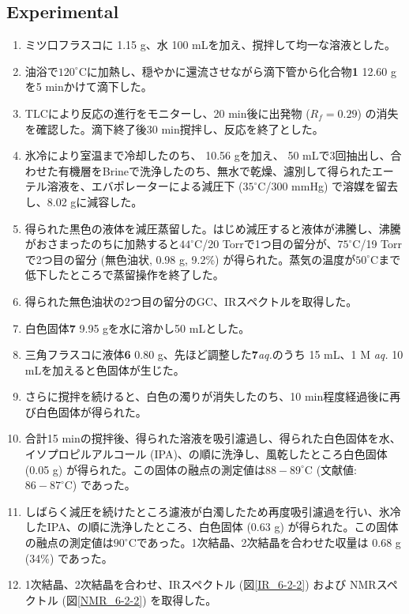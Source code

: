 \documentclass{ltjsarticle}
\theoremstyle{definition}
\numberwithin{equation}{section}
\newcommand{\D}{^\circ\text{C}}
\begin{document}
\subsection{Experimental}
\begin{enumerate}
\item ミツ口フラスコに 1.15 g、水 100 mLを加え、撹拌して均一な溶液とした。
\item 油浴で$120\D$に加熱し、穏やかに還流させながら滴下管から化合物\textbf{1} 12.60 gを5 minかけて滴下した。 
\item TLCにより反応の進行をモニターし、20 min後に出発物 ($R_f = 0.29
$) の消失を確認した。滴下終了後30 min撹拌し、反応を終了とした。
\item 氷冷により室温まで冷却したのち、 10.56 gを加え、 50 mLで3回抽出し、合わせた有機層をBrineで洗浄したのち、無水で乾燥、濾別して得られたエーテル溶液を、エバポレーターによる減圧下 ($35\D$/300 mmHg) で溶媒を留去し、8.02 gに減容した。
\item 得られた黒色の液体を減圧蒸留した。はじめ減圧すると液体が沸騰し、沸騰がおさまったのちに加熱すると$44\D$/20 Torrで1つ目の留分が、$75\D$/19 Torrで2つ目の留分 (無色油状, 0.98 g, 9.2\%) が得られた。蒸気の温度が$50\D$まで低下したところで蒸留操作を終了した。
\item 得られた無色油状の2つ目の留分のGC、IRスペクトルを取得した。
\item 白色固体\textbf{7} 9.95 gを水に溶かし50 mLとした。
\item 三角フラスコに液体\textbf{6} 0.80 g、先ほど調整した\textbf{7}\textit{aq.}のうち 15 mL、1 M \textit{aq.} 10 mLを加えると色固体が生じた。
\item さらに撹拌を続けると、白色の濁りが消失したのち、10 min程度経過後に再び白色固体が得られた。
\item 合計15 minの撹拌後、得られた溶液を吸引濾過し、得られた白色固体を水、イソプロピルアルコール (IPA)、の順に洗浄し、風乾したところ白色固体 (0.05 g) が得られた。この固体の融点の測定値は$88-89\D$ (文献値: $86-87\D$) であった。
\item しばらく減圧を続けたところ濾液が白濁したため再度吸引濾過を行い、氷冷したIPA、の順に洗浄したところ、白色固体 (0.63 g) が得られた。この固体の融点の測定値は$90\D$であった。1次結晶、2次結晶を合わせた収量は 0.68 g (34\%) であった。
\item 1次結晶、2次結晶を合わせ、IRスペクトル (図\ref{IR_6-2-2}) および NMRスペクトル (図\ref{NMR_6-2-2}) を取得した。
\end{enumerate}
\end{document}

